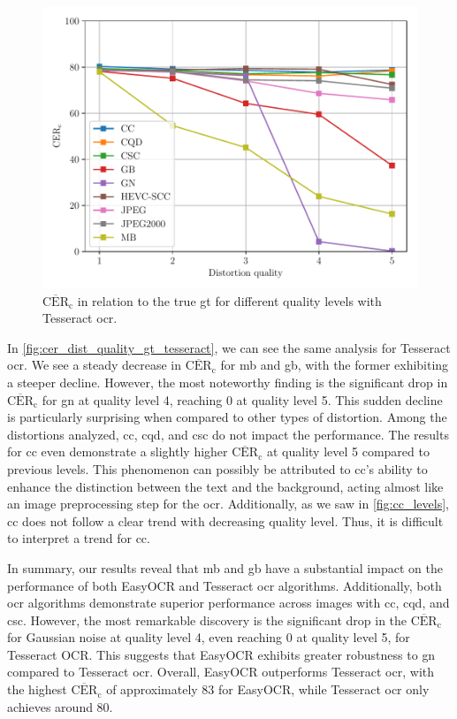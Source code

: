 \begin{figure}
\centering
    \includegraphics[width=\textwidth]{../../images/analyze/cer_dist_quality_gt_tess.pdf}
    \caption{$\overline{\text{CER}}_{\text{c}}$ in relation to the true \gls{gt} for different quality levels with Tesseract \gls{ocr}.}
\label{fig:cer_dist_quality_gt_tesseract}
\end{figure}
In \autoref{fig:cer_dist_quality_gt_tesseract}, we can see the same analysis for Tesseract \gls{ocr}.
We see a steady decrease in $\overline{\text{CER}}_{\text{c}}$ for \gls{mb} and \gls{gb}, with the former exhibiting a steeper decline.
However, the most noteworthy finding is the significant drop in $\overline{\text{CER}}_{\text{c}}$ for \gls{gn} at quality level 4, reaching 0 at quality level 5.
This sudden decline is particularly surprising when compared to other types of distortion.
Among the distortions analyzed, \gls{cc}, \gls{cqd}, and \gls{csc} do not impact the performance.
The results for \gls{cc} even demonstrate a slightly higher $\overline{\text{CER}}_{\text{c}}$ at quality level 5 compared to previous levels.
This phenomenon can possibly be attributed to \gls{cc}'s ability to enhance the distinction between the text and the background, acting almost like an image preprocessing step for the \gls{ocr}.
Additionally, as we saw in \autoref{fig:cc_levels}, \gls{cc} does not follow a clear trend with decreasing quality level.
Thus, it is difficult to interpret a trend for \gls{cc}.

In summary, our results reveal that \gls{mb} and \gls{gb} have a substantial impact on the performance of both EasyOCR and Tesseract \gls{ocr} algorithms.
Additionally, both \gls{ocr} algorithms demonstrate superior performance across images with \gls{cc}, \gls{cqd}, and \gls{csc}.
However, the most remarkable discovery is the significant drop in the $\overline{\text{CER}}_{\text{c}}$ for Gaussian noise at quality level 4, even reaching 0 at quality level 5, for Tesseract OCR.
This suggests that EasyOCR exhibits greater robustness to \gls{gn} compared to Tesseract \gls{ocr}.
Overall, EasyOCR outperforms Tesseract \gls{ocr}, with the highest $\overline{\text{CER}}_{\text{c}}$ of approximately 83 for EasyOCR, while Tesseract \gls{ocr} only achieves around 80.




